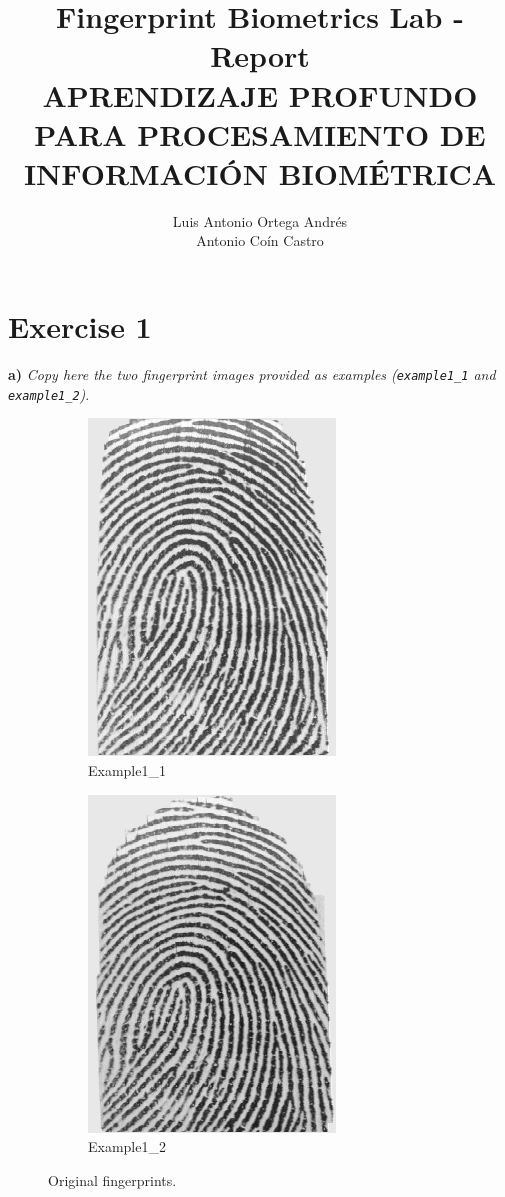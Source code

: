 \documentclass[11pt]{article}
\author{Luis Antonio Ortega Andrés\\Antonio Coín Castro}
\date{}
\title{Fingerprint Biometrics Lab - Report\\\medskip
\large APRENDIZAJE PROFUNDO PARA PROCESAMIENTO DE INFORMACIÓN BIOMÉTRICA}
\begin{document}
\maketitle

\section*{Exercise 1}
\textbf{a) } \emph{Copy here the two fingerprint images provided as examples (\texttt{example1\_1} and \texttt{example1\_2})}.

\begin{figure}[h!]
  \centering
       \begin{subfigure}[t]{0.45\textwidth}
         \centering
         \includegraphics[scale=1.0]{img/example1_1.png}
         \caption{Example1\_1}
     \end{subfigure}%
     \quad
     \begin{subfigure}[t]{0.45\textwidth}
         \centering
         \includegraphics[scale=1.0]{img/example1_2.png}
         \caption{Example1\_2}
     \end{subfigure}
    \caption{Original fingerprints.}
\end{figure}
\end{document}
